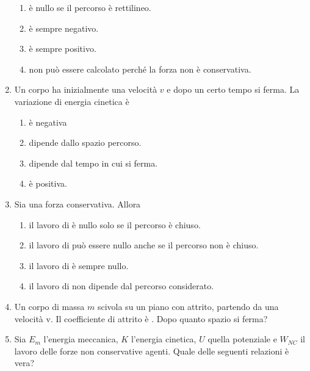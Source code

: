 \documentclass{article}
\begin{document}
\begin{enumerate}
  \begin{enumerate}[label=\Alph*.]
    \item è nullo se il percorso è rettilineo.
    \item è sempre negativo.
    \item è sempre positivo.
    \item non può essere calcolato perché la forza non è conservativa.
  \end{enumerate}
  \item Un corpo ha inizialmente una velocità $v$ e dopo un certo tempo si ferma. La variazione di energia cinetica è
  \begin{enumerate}[label=\Alph*.]
    \item è negativa
    \item dipende dallo spazio percorso.
    \item dipende dal tempo in cui si ferma.
    \item è positiva.
  \end{enumerate}
  \item Sia  una forza conservativa. Allora
  \begin{enumerate}[label=\Alph*.]
    \item il lavoro di  è nullo solo se il percorso è chiuso.
    \item il lavoro di  può essere nullo anche se il percorso non è chiuso.
    \item il lavoro di  è sempre nullo.
    \item il lavoro di  non dipende dal percorso considerato.
  \end{enumerate}
  \item Un corpo di massa $m$ scivola su un piano con attrito, partendo da una velocità v. Il coefficiente di attrito è \mu. Dopo quanto spazio si ferma?
  \begin{enumerate}[label=\Alph*.]
    \item $\frac{1}{2}v^2+\mu g$.
    \item $\frac{v^2}{2g\mu}}$.
    \item $\frac{2v^2}{g\mu}}$.
    \item $\frac{1}{2}v^2-\mu g$.
  \end{enumerate}
  \item Sia $E_m$ l'energia meccanica, $K$ l'energia cinetica, $U$ quella potenziale e $W_{NC}$ il lavoro delle forze non conservative agenti. Quale delle seguenti relazioni è vera?
  \begin{enumerate}[label=\Alph*.]

\end{enumerate}
\end{enumerate}
\end{document}
